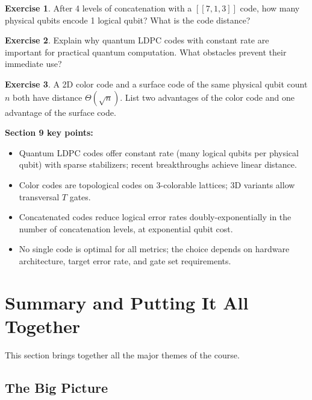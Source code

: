 \documentclass[11pt, a4paper]{article}
\theoremstyle{definition}
\newtheorem{exercise}{Exercise}[section]
\theoremstyle{plain}
\theoremstyle{remark}
\newcommand{\code}[1]{[\![#1]\!]}
\begin{document}
\begin{exercise}
After 4 levels of concatenation with a $\code{7,1,3}$ code, how many
physical qubits encode 1 logical qubit?  What is the code distance?
\end{exercise}

\begin{exercise}
Explain why quantum LDPC codes with constant rate are important for practical
quantum computation.  What obstacles prevent their immediate use?
\end{exercise}

\begin{exercise}
A 2D color code and a surface code of the same physical qubit count $n$
both have distance $\Theta(\sqrt{n})$.  List two advantages of the color
code and one advantage of the surface code.
\end{exercise}

\begin{summarybox}
\textbf{Section 9 key points:}
\begin{itemize}
  \item Quantum LDPC codes offer constant rate (many logical qubits per
        physical qubit) with sparse stabilizers; recent breakthroughs
        achieve linear distance.
  \item Color codes are topological codes on 3-colorable lattices; 3D
        variants allow transversal $T$ gates.
  \item Concatenated codes reduce logical error rates doubly-exponentially
        in the number of concatenation levels, at exponential qubit cost.
  \item No single code is optimal for all metrics; the choice depends on
        hardware architecture, target error rate, and gate set requirements.
\end{itemize}
\end{summarybox}

\newpage
\section{Summary and Putting It All Together}
\label{sec:summary}

This section brings together all the major themes of the course.

\subsection{The Big Picture}
\end{document}
